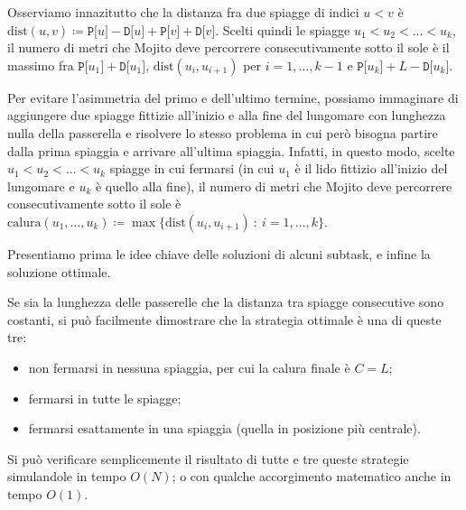 \newpage
\setcounter{figure}{0}


\pagecolor{backcolor}


\newcommand{\dist}{\ensuremath{\mathrm{dist}}} 
\newcommand{\calura}{\ensuremath{\mathrm{calura}}} 
\newtheorem*{lemma}{Lemma}

\Solution

Osserviamo innazitutto che la distanza fra due spiagge di indici $u<v$ è $\dist (u,v) \coloneqq \texttt{P[}u \texttt{]} - \texttt{D[}u\texttt{]} + \texttt{P[}v\texttt{]}+\texttt{D[}v\texttt{]}$. 
Scelti quindi le spiagge $u_1 < u_2 < \ldots < u_k$, il numero di metri che Mojito deve percorrere consecutivamente sotto il sole è il massimo fra $\texttt{P[}u_1 \texttt{]} + \texttt{D[}u_1 \texttt{]} $, $\dist(u_i,u_{i+1})$ per $i=1,\ldots, k-1$ e $\texttt{P[}u_k\texttt{]}+L-\texttt{D[}u_k\texttt{]}$.

Per evitare l'asimmetria del primo e dell'ultimo termine, possiamo immaginare di aggiungere due spiagge fittizie all'inizio e alla fine del lungomare con lunghezza nulla della passerella e risolvere lo stesso problema in cui però bisogna partire dalla prima spiaggia e arrivare all'ultima spiaggia. Infatti, in questo modo, scelte $u_1 < u_2 < \ldots < u_k$ spiagge in cui fermarsi (in cui $u_1$ è il lido fittizio all'inizio del lungomare e $u_k$ è quello alla fine), il numero di metri che Mojito deve percorrere consecutivamente sotto il sole è $\calura(u_1,\ldots,u_k) \coloneqq \max \{ \dist(u_i,u_{i+1}) \ : \ i=1,\ldots,k\}$.

Presentiamo prima le idee chiave delle soluzioni di alcuni subtask, e infine la soluzione ottimale.

\Costante

Se sia la lunghezza delle passerelle che la distanza tra spiagge consecutive sono costanti, si può facilmente dimostrare che la strategia ottimale è una di queste tre:
\begin{itemize}
	\item non fermarsi in nessuna spiaggia, per cui la calura finale è $C = L$;
	\item fermarsi in tutte le spiagge;
	\item fermarsi esattamente in una spiaggia (quella in posizione più centrale).
\end{itemize}
Si può verificare semplicemente il risultato di tutte e tre queste strategie simulandole in tempo $O(N)$; o con qualche accorgimento matematico anche in tempo $O(1)$.

